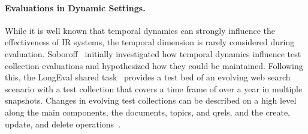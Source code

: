 \vspace*{-1ex}

\paragraph{Evaluations in Dynamic Settings.} While it is well known that temporal dynamics can strongly influence the effectiveness of IR systems, the temporal dimension is rarely considered during evaluation. Soboroff~\cite{DBLP:conf/sigir/Soboroff06} initially investigated how temporal dynamics influence test collection evaluations and hypothesized how they could be maintained. Following this, the LongEval shared task~\cite{DBLP:conf/clef/AlkhalifaBDEAFG24,alkhalifa:2023} provides a test bed of an evolving web search scenario with a test collection that covers a time frame of over a year in multiple snapshots. Changes in evolving test collections can be described on a high level along the main components, the documents, topics, and qrels, and the create, update, and delete operations~\cite{keller:2024}. %
